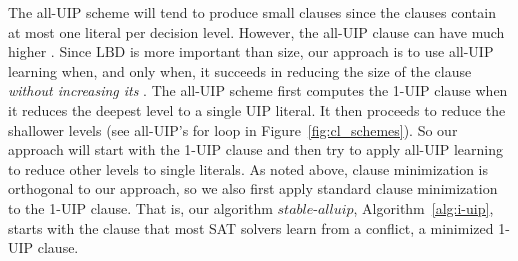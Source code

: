 \documentclass[runningheads]{llncs}
\newcommand{\sat}{SAT\xspace}
\newcommand{\oneuip}{1-UIP\xspace}
\newcommand{\alluip}{all-UIP\xspace}
\newcommand{\LBD}{\text{LBD}\xspace}
\newcommand{\stablealluip}{\textit{stable-alluip}\xspace}
\begin{document}
The \alluip scheme will tend to produce small clauses since the
clauses contain at most one literal per decision level. However, the
\alluip clause can have much higher \LBD. Since $\LBD$ is more
important than size, our approach is to use \alluip learning when, and
only when, it succeeds in reducing the size of the clause
\emph{without increasing its \LBD}. The \alluip scheme first computes
the \oneuip clause when it reduces the deepest level to a single UIP
literal. It then proceeds to reduce the shallower levels (see
\alluip's for loop in Figure~\ref{fig:cl_schemes}). So our approach
will start with the \oneuip clause and then try to apply \alluip
learning to reduce other levels to single literals. As noted above,
clause minimization is orthogonal to our approach, so we also first
apply standard clause minimization \cite{DBLP:conf/sat/SorenssonB09}
to the \oneuip clause. That is, our algorithm $\stablealluip$,
Algorithm~\ref{alg:i-uip}, starts with the clause that most \sat
solvers learn from a conflict, a minimized \oneuip clause. 
\end{document}
